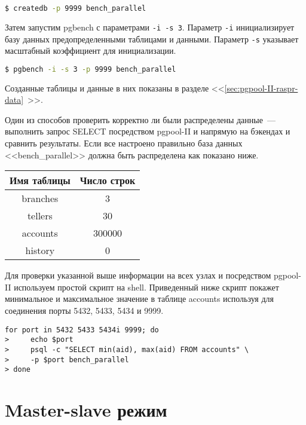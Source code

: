 \begin{lstlisting}[language=Bash,label=lst:pgpool37,caption=Проверка параллельного запроса]
$ createdb -p 9999 bench_parallel
\end{lstlisting}

Затем запустим pgbench с параметрами \lstinline!-i -s 3!. Параметр \lstinline!-i! инициализирует базу данных предопределенными таблицами и данными. Параметр \lstinline!-s! указывает масштабный коэффициент для инициализации.

\begin{lstlisting}[language=Bash,label=lst:pgpool38,caption=Проверка параллельного запроса]
$ pgbench -i -s 3 -p 9999 bench_parallel
\end{lstlisting}

Созданные таблицы и данные в них показаны в разделе <<\ref{sec:pgpool-II-raspr-data}~>>.

Один из способов проверить корректно ли были распределены данные~--- выполнить запрос SELECT посредством pgpool-II и напрямую на бэкендах и сравнить результаты. Если все настроено правильно база данных <<bench\_parallel>> должна быть распределена как показано ниже.

\begin{tabular}{ | c | c | }
  \hline
  Имя таблицы & Число строк \\
  \hline
  branches & 3 \\
  \hline
  tellers & 30 \\
  \hline
  accounts & 300000 \\
  \hline
  history & 0 \\
  \hline
\end{tabular}

Для проверки указанной выше информации на всех узлах и посредством pgpool-II используем простой скрипт на shell. Приведенный ниже скрипт покажет минимальное и максимальное значение в таблице accounts используя для соединения порты 5432, 5433, 5434 и 9999.

\begin{lstlisting}[label=lst:pgpool39,caption=Проверка параллельного запроса]
for port in 5432 5433 5434i 9999; do
>     echo $port
>     psql -c "SELECT min(aid), max(aid) FROM accounts" \
>     -p $port bench_parallel
> done
\end{lstlisting}


\section{Master-slave режим}

